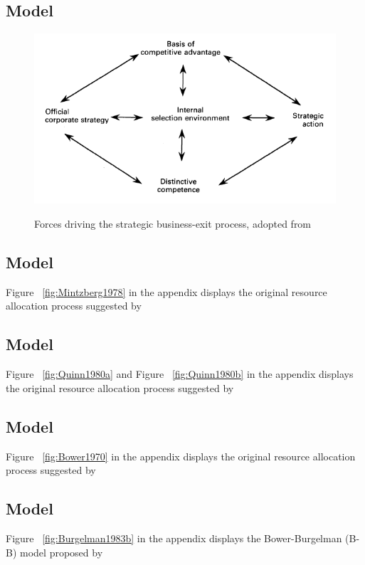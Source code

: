 \documentclass[12pt,letterpaper]{article}
\begin{document}
\subsection{\cite{Burgelman1994} Model}
\begin{figure}[h]
\begin{centering}
  \caption{Forces driving the strategic business-exit process, adopted from \cite{Burgelman1994}}
  \includegraphics[width=\textwidth]{Burgelman1994}
  \label{fig:Burgelman1994}
\end{centering}
\end{figure}

\subsection{\cite{Mintzberg1978} Model}
Figure ~\ref{fig:Mintzberg1978} in the appendix displays the original resource allocation process suggested by \cite{Mintzberg1978}

\subsection{\cite{Quinn1980} Model}
Figure ~\ref{fig:Quinn1980a} and Figure ~\ref{fig:Quinn1980b} in the appendix displays the original resource allocation process suggested by \cite{Quinn1980}

\subsection{\cite{Bower1970} Model}
Figure ~\ref{fig:Bower1970} in the appendix displays the original resource allocation process suggested by \cite{Bower1970}

\subsection{\cite{Burgelman1983b} Model}
Figure ~\ref{fig:Burgelman1983b} in the appendix displays the Bower-Burgelman (B-B) model proposed by \cite{Burgelman1983b}
\end{document}
